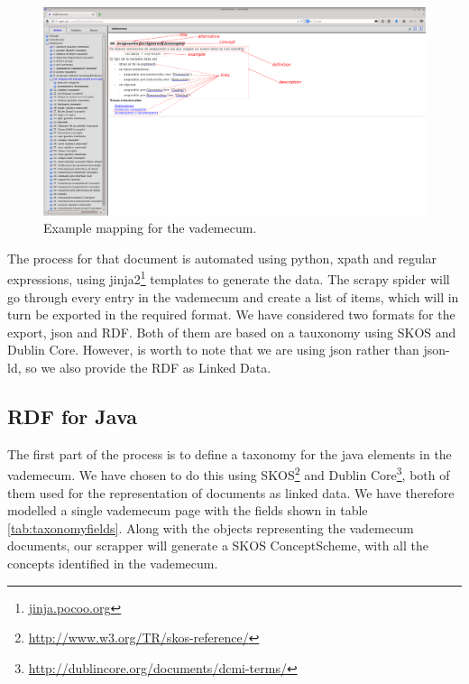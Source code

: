 \begin{figure}[!htbp]
    \centering
    \includegraphics[width=1.1\textwidth]{img/screens/vademecum-ex.png}
    \caption{Example mapping for the vademecum.}
    \label{fig:vademecum1}
\end{figure}

The process for that document is automated using python, xpath and regular expressions, using jinja2\footnote{\url{jinja.pocoo.org}} templates to generate the data. The scrapy spider will go through every entry in the vademecum and create a list of items, which will in turn be exported in the required format. We have considered two formats for the export, json and RDF. Both of them are based on a tauxonomy using SKOS and Dublin Core. However, is worth to note that we are using json rather than json-ld, so we also provide the RDF as Linked Data.

\subsection{RDF for Java}

The first part of the process is to define a taxonomy for the java elements in the vademecum. We have chosen to do this using SKOS\footnote{\url{http://www.w3.org/TR/skos-reference/}} and Dublin Core\footnote{\url{http://dublincore.org/documents/dcmi-terms/}}, both of them used for the representation of documents as linked data. We have therefore modelled a single vademecum page with the fields shown in table \ref{tab:taxonomyfields}. Along with the objects representing the vademecum documents, our scrapper will generate a SKOS ConceptScheme, with all the concepts identified in the vademecum. 


